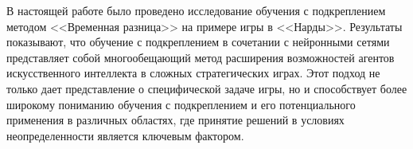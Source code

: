 В настоящей работе было проведено исследование обучения с подкреплением методом <<Временная разница>> на примере игры в <<Нарды>>. Результаты показывают, что обучение с подкреплением в сочетании с нейронными сетями представляет собой многообещающий метод расширения возможностей агентов искусственного интеллекта в сложных стратегических играх. Этот подход не только дает представление о специфической задаче игры, но и способствует более широкому пониманию обучения с подкреплением и его потенциального применения в различных областях, где принятие решений в условиях неопределенности является ключевым фактором.
